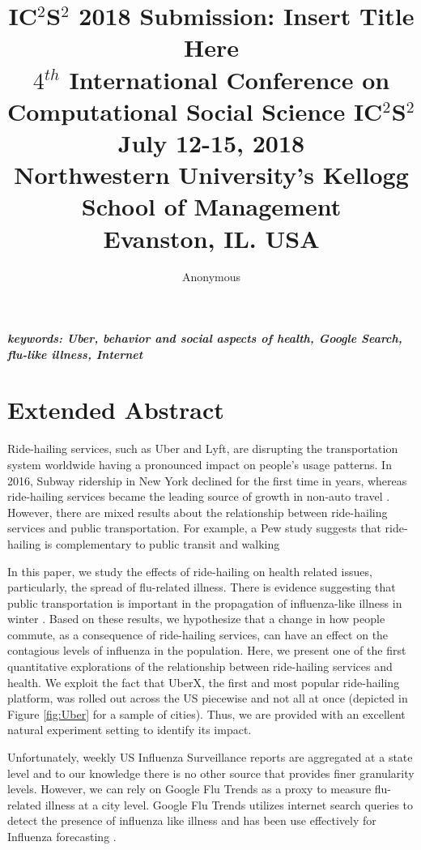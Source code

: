 \documentclass[a4paper,12pt]{article}
\title{IC$^{2}$S$^{2}$ 2018 Submission: Insert Title Here \\
	\normalsize $4$$^{th}$ International Conference on Computational Social Science IC$^{2}$S$^{2}$ \\
	\normalsize July 12-15, 2018 \\
	\normalsize Northwestern University’s Kellogg School of Management \\
	\normalsize Evanston, IL. USA
}
\author[1]{Anonymous} %
\date{}
\begin{document}
\maketitle

\vspace{-2em}

\begin{center}
\textbf{\textit{keywords: Uber, behavior and social aspects of health, Google Search, flu-like illness, Internet }}
\newline
\end{center}


\section{Extended Abstract}
Ride-hailing services, such as Uber and Lyft, are disrupting the transportation system worldwide having a pronounced impact on people's usage patterns. In 2016, Subway ridership in New York declined for the first time in years, whereas ride-hailing services became the leading source of growth in non-auto travel \cite{schaller2017unsustainable}. However, there are mixed results about the relationship between ride-hailing services and public transportation. For example, a Pew study suggests that ride-hailing is complementary to public transit and walking %

In this paper, we study the effects of ride-hailing on health related issues, particularly, the spread of flu-related illness. There is evidence suggesting that public transportation is important in the propagation of influenza-like illness in winter \cite{troko2011public,cooley2011role}. Based on these results, we hypothesize that a change in how people commute, as a consequence of ride-hailing services, can have an effect on the contagious levels of influenza in the population. Here, we present one of the first quantitative explorations of the relationship between ride-hailing services and health. We exploit the fact that UberX, the first and most popular ride-hailing platform, was rolled out across the US piecewise and not all at once (depicted in Figure \ref{fig:Uber} for a sample of cities). Thus, we are provided with an excellent natural experiment setting to identify its impact. 

Unfortunately, weekly US Influenza Surveillance reports are aggregated at a state level and to our knowledge there is no other source that provides finer granularity levels. However, we can rely on Google Flu Trends as a proxy to measure flu-related illness at a city level. Google Flu Trends utilizes internet search queries to detect the presence of influenza like illness and has been use effectively for Influenza forecasting \cite{yang2015accurate,dugas2013influenza}.
\end{document}
